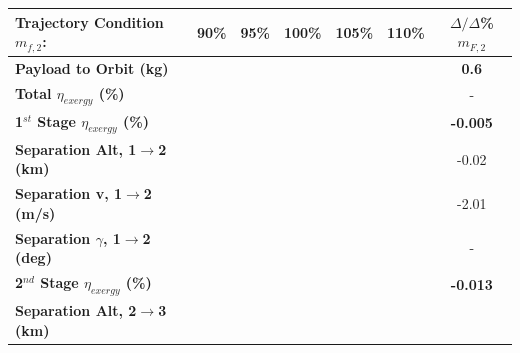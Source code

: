 \begin{table}[ht]%
	\centering
\begin{tabular}{l c c c c c c} 
	\hline \textbf{Trajectory Condition}   \qquad  $m_{f,2}$:
	&90\%
	&95\%
	&100\%
	&105\%
	&110\%
	& $\Delta/\Delta$\%$m_{F,2}$
	\\
	\hline \textbf{Payload to Orbit (kg)}
	& \textbf{\PayloadToOrbitmFuelNinety}
	& \textbf{\PayloadToOrbitmFuelNinetyFive}
	& \textbf{\PayloadToOrbitmFuelStandard}
	& \textbf{\PayloadToOrbitmFuelOneHundredFive}
	& \textbf{\PayloadToOrbitmFuelOneHundredTen}
	&\textbf{0.6}
	\\
	\textbf{Total $\eta_{exergy}$ (\%)}
	& \textbf{\totalExergyEffmFuelNinety}
	& \textbf{\totalExergyEffmFuelNinetyFive}
	& \textbf{\totalExergyEffmFuelStandard}
	& \textbf{\totalExergyEffmFuelOneHundredFive}
	& \textbf{\totalExergyEffmFuelOneHundredTen}
	& -
	\\
	\hline 
	\textbf{1$^{st}$ Stage $\eta_{exergy}$ (\%)}
	& \textbf{\firstExergyEffmFuelNinety}
	& \textbf{\firstExergyEffmFuelNinetyFive}
	& \textbf{\firstExergyEffmFuelStandard}
	& \textbf{\firstExergyEffmFuelOneHundredFive}
	& \textbf{\firstExergyEffmFuelOneHundredTen}
	& \textbf{-0.005}
	\\
	\textbf{Separation Alt, 1$\rightarrow$2 (km)}
	& \firstsecondSeparationAltmFuelNinety
	& \firstsecondSeparationAltmFuelNinetyFive
	& \firstsecondSeparationAltmFuelStandard
	& \firstsecondSeparationAltmFuelOneHundredFive
	& \firstsecondSeparationAltmFuelOneHundredTen
	&-0.02
	\\
	\textbf{Separation v, 1$\rightarrow$2 (m/s)}
	& \firstsecondSeparationvmFuelNinety
	& \firstsecondSeparationvmFuelNinetyFive
	& \firstsecondSeparationvmFuelStandard
	& \firstsecondSeparationvmFuelOneHundredFive
	& \firstsecondSeparationvmFuelOneHundredTen
	&-2.01
	\\
	\textbf{Separation $\gamma$, 1$\rightarrow$2 (deg)}
	& \firstsecondSeparationgammamFuelNinety
	& \firstsecondSeparationgammamFuelNinetyFive
	& \firstsecondSeparationgammamFuelStandard
	& \firstsecondSeparationgammamFuelOneHundredFive
	& \firstsecondSeparationgammamFuelOneHundredTen
	& -
	\\
	\hline 
	\textbf{2$^{nd}$ Stage $\eta_{exergy}$ (\%)}
	& \textbf{\secondExergyEffmFuelNinety}
	& \textbf{\secondExergyEffmFuelNinetyFive}
	& \textbf{\secondExergyEffmFuelStandard}
	& \textbf{\secondExergyEffmFuelOneHundredFive}
	& \textbf{\secondExergyEffmFuelOneHundredTen}
	& \textbf{-0.013}
	\\
	\textbf{Separation Alt, 2$\rightarrow$3 (km)}

\end{tabular}
\end{table}
